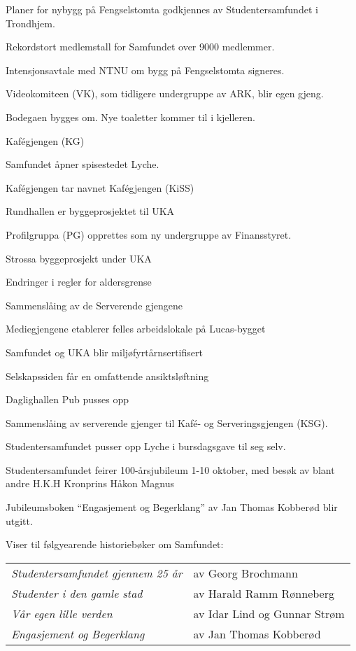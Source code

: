 \documentclass[fsbok.tex]{subfiles}
\begin{document}
  \item Planer for nybygg på Fengselstomta godkjennes av Studentersamfundet i Trondhjem.
\yearend 

  \item Rekordstort medlemstall for Samfundet over 9000 medlemmer.
  \item Intensjonsavtale med NTNU om bygg på Fengselstomta signeres.
  \item Videokomiteen (VK), som tidligere undergruppe av ARK, blir egen gjeng.
  \item Bodegaen bygges om. Nye toaletter kommer til i kjelleren.
  \item Kafégjengen (KG)
\yearend 

  \item Samfundet åpner spisestedet Lyche.
  \item Kafégjengen tar navnet Kafégjengen (KiSS)
\yearend 

  \item Rundhallen er byggeprosjektet til UKA
  \item Profilgruppa (PG) opprettes som ny undergruppe av Finansstyret.
\yearend 

 \item Strossa byggeprosjekt under UKA
 \item Endringer i regler for aldersgrense
 \item Sammenslåing av de Serverende gjengene
 \item Mediegjengene etablerer felles arbeidslokale på Lucas-bygget
 \item Samfundet og UKA blir miljøfyrtårnsertifisert
 \item Selskapssiden får en omfattende ansiktsløftning
 \item Daglighallen Pub pusses opp
\yearend 

 \item Sammenslåing av serverende gjenger til Kaf\'e- og Serveringsgjengen (KSG).
 \item Studentersamfundet pusser opp Lyche i bursdagsgave til seg selv.
 \item Studentersamfundet feirer 100-årsjubileum 1-10 oktober, med besøk av blant andre H.K.H Kronprins Håkon 
 Magnus
 \item Jubileumsboken ``Engasjement og Begerklang'' av Jan Thomas Kobberød blir utgitt.
\yearend 

Viser til følgyearende historiebøker om Samfundet:

\begin{tabular}{ll}
    \emph{Studentersamfundet gjennem 25 år} & av Georg Brochmann\\
    \emph{Studenter i den gamle stad} &  av Harald Ramm Rønneberg\\
    \emph{Vår egen lille verden} &  av Idar Lind og Gunnar Strøm\\
    \emph{Engasjement og Begerklang} & av Jan Thomas Kobberød
\end{tabular}
\end{document}

